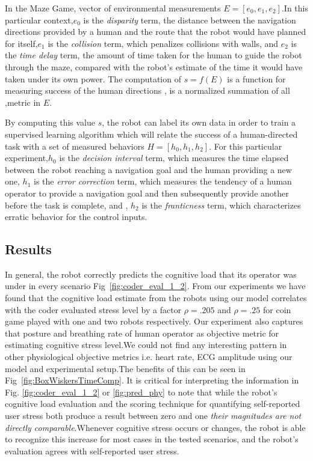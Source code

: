 \documentclass{sig-alternate}
\begin{document}
In the Maze Game,  vector of environmental measurements $E = [e_0, e_1, e_2]$.In this particular context,$e_0$ is the
\emph{disparity} term, the distance between the navigation directions provided by a human and the route that the robot
would have planned for itself,$e_1$ is the \emph{collision} term, which penalizes collisions with walls, and $e_2$ is
the \emph{time delay} term, the amount of time taken for the human to guide the robot through the maze, compared with
the robot's estimate of the time it would have taken under its own power. The computation of $s = f(E)$ is a function
for measuring success of the human directions , is a normalized summation of all ,metric in $E$.

By computing this value $s$, the robot can label its own data in order to train a supervised learning algorithm which
will relate the success of a human-directed task with a set of measured behaviors $H = [h_0, h_1, h_2]$. For this particular experiment,$h_0$ is the \emph{decision interval}
term, which measures the time elapsed between the robot reaching a navigation goal and the human providing a new one,
$h_1$ is the \emph{error correction} term, which measures the tendency of a human operator to provide a navigation goal
and then subsequently provide another before the task is complete, and , $h_2$ is the \emph{franticness} term, which
characterizes erratic behavior for the control inputs.

\subsection{Results} In general, the robot correctly predicts the cognitive load that its operator was under in every
scenario Fig~\ref{fig:coder_eval_1_2}. From our experiments we
have found that the cognitive load estimate from the robots using our model correlates with the coder evaluated stress
level by a factor $\rho=.205$ and $\rho=.25$ for coin game played with one and two robots respectively. Our experiment
also captures that posture and breathing rate of human operator as objective metric for estimating cognitive stress
level.We could not find any interesting pattern in other physiological objective metrics i.e. heart rate, ECG amplitude
using our model and experimental setup.The benefits of this can be seen in Fig~\ref{fig:BoxWiskersTimeComp}.  It is critical for interpreting the information in
Fig. \ref{fig:coder_eval_1_2} or \ref{fig:pred_phy} to note that while the robot's cognitive load evaluation and the
scoring technique for quantifying self-reported user stress both produce a result between zero and one \textit{their
magnitudes are not directly comparable}.Whenever cognitive stress occurs or changes, the robot is able to recognize this
increase for most cases in the tested scenarios, and the robot's evaluation agrees with self-reported user stress.
\end{document}
